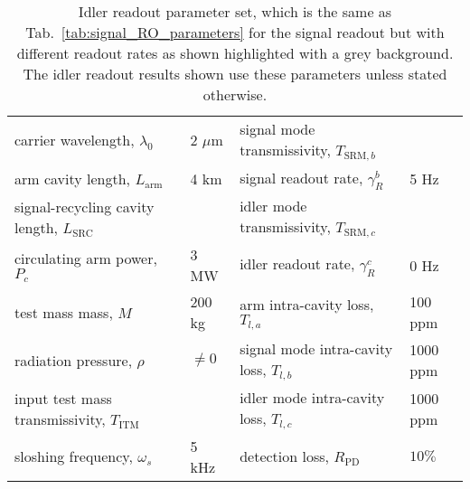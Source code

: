 \begin{table}[]
\centering
\begin{tabular}{@{}ll|ll@{}}
\toprule
carrier wavelength, $\lambda_0$ & 2 $\mu\text{m}$ & \cellcolor[HTML]{EFEFEF}signal mode transmissivity, $T_{\text{SRM},b}$ & \cellcolor[HTML]{EFEFEF} \\
arm cavity length, $L_\text{arm}$ & 4 km & \cellcolor[HTML]{EFEFEF}signal readout rate, $\gamma^b_R$ & \cellcolor[HTML]{EFEFEF}5 Hz \\
signal-recycling cavity length, $L_\text{SRC}$ &  & \cellcolor[HTML]{EFEFEF}idler mode transmissivity, $T_{\text{SRM},c}$ & \cellcolor[HTML]{EFEFEF} \\
circulating arm power, $P_c$ & 3 MW & \cellcolor[HTML]{EFEFEF}idler readout rate, $\gamma^c_R$ & \cellcolor[HTML]{EFEFEF}0 Hz \\
test mass mass, $M$ & 200 kg & arm intra-cavity loss, $T_{l,a}$ & 100 ppm \\
radiation pressure, $\rho$ & $\neq0$ & signal mode intra-cavity loss, $T_{l,b}$ & 1000 ppm \\
input test mass transmissivity, $T_\text{ITM}$ &  & idler mode intra-cavity loss, $T_{l,c}$ & 1000 ppm \\
sloshing frequency, $\omega_s$ & 5 kHz & detection loss, $R_\text{PD}$ & $10\%$ \\ \bottomrule
\end{tabular}
\caption{ Idler readout parameter set, which is the same as Tab.~\ref{tab:signal_RO_parameters} for the signal readout but with different readout rates as shown highlighted with a grey background. The idler readout results shown use these parameters unless stated otherwise.}
\label{tab:idler_RO_parameters}
\end{table}

